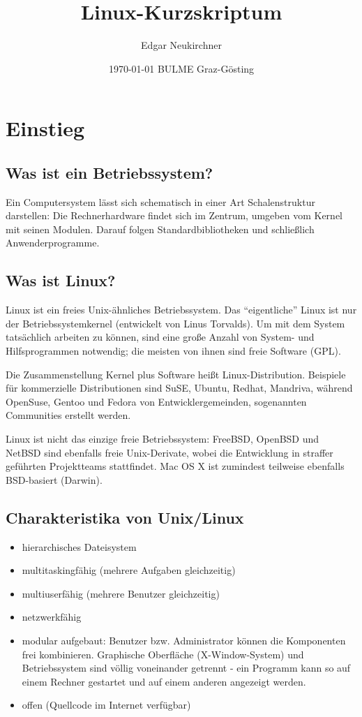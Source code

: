 \documentclass[11pt]{article}
\title{Linux-Kurzskriptum}
\author{Edgar Neukirchner}
\date{\today{} BULME Graz-Gösting}
\begin{document}
\maketitle
\newpage
\tableofcontents
\newpage

\section{Einstieg} 
\subsection{Was ist ein Betriebssystem?}
Ein Computersystem lässt sich schematisch in einer Art Schalenstruktur
darstellen: Die Rechnerhardware findet sich im Zentrum, umgeben vom
Kernel mit seinen Modulen. Darauf folgen Standardbibliotheken und
schließlich Anwenderprogramme.

\subsection{Was ist Linux?} 
Linux ist ein freies Unix-ähnliches Betriebssystem. Das ``eigentliche''
Linux ist nur der Betriebssystemkernel (entwickelt von Linus Torvalds).
Um mit dem System tatsächlich arbeiten zu können, sind eine große Anzahl
von System- und Hilfsprogrammen notwendig; die meisten von ihnen sind
freie Software (GPL).

Die Zusammenstellung Kernel plus Software heißt Linux-Distribution.
Beispiele für kommerzielle Distributionen sind SuSE, Ubuntu, Redhat, Mandriva,
während OpenSuse, Gentoo und Fedora von Entwicklergemeinden, sogenannten
Communities erstellt werden.

Linux ist nicht das einzige freie Betriebssystem: FreeBSD, OpenBSD und
NetBSD sind ebenfalls freie Unix-Derivate, wobei die Entwicklung in
straffer geführten Projektteams stattfindet. Mac OS X ist zumindest
teilweise ebenfalls BSD-basiert (Darwin).

\subsection{Charakteristika von Unix/Linux}

\begin{itemize}
\item hierarchisches Dateisystem
\item multitaskingfähig (mehrere Aufgaben gleichzeitig)
\item multiuserfähig (mehrere Benutzer gleichzeitig) 
\item netzwerkfähig
\item modular aufgebaut: Benutzer bzw. Administrator können die
Komponenten frei kombinieren. Graphische Oberfläche (X-Window-System)
und Betriebssystem sind völlig voneinander getrennt - ein Programm kann
so auf einem Rechner gestartet und auf einem anderen angezeigt werden.
\item offen (Quellcode im Internet verfügbar)
\end{itemize}
\end{document}
